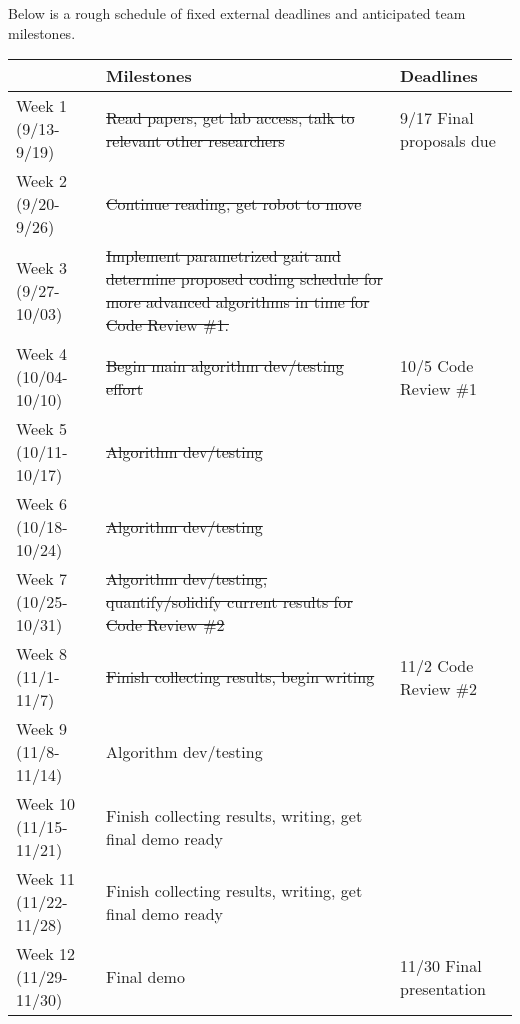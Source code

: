 Below is a rough schedule of fixed external deadlines and anticipated
team milestones.

\newcommand{\done}[1]{{\color{doneColor}\sout{#1}}}

\begin{center}
\begin{tabular}{|l||p{2.5in}|p{1.5in}|}
\hline
                        & {\bf Milestones} & {\bf Deadlines}
\\ \hline

Week 1 (9/13-9/19)    & \done{Read papers, get lab access, talk to relevant other researchers} & 9/17 Final proposals due
\\ \hline

Week 2 (9/20-9/26)    & \done{Continue reading, get robot to move} &
\\ \hline

Week 3 (9/27-10/03)   & \done{Implement parametrized gait and determine proposed coding schedule for more advanced algorithms in time for Code Review \#1.} &
\\ \hline

Week 4 (10/04-10/10)  & \done{Begin main algorithm dev/testing effort} & 10/5 Code Review \#1
\\ \hline

Week 5 (10/11-10/17)  & \done{Algorithm dev/testing} &
\\ \hline

Week 6 (10/18-10/24)  & \done{Algorithm dev/testing} &
\\ \hline

Week 7 (10/25-10/31)  & \done{Algorithm dev/testing, quantify/solidify current results for Code Review \#2} &
\\ \hline

Week 8 (11/1-11/7)    & \done{Finish collecting results, begin writing} & 11/2 Code Review \#2
\\ \hline

Week 9 (11/8-11/14)   & Algorithm dev/testing &
\\ \hline

Week 10 (11/15-11/21) & Finish collecting results, writing, get final demo ready &
\\ \hline

Week 11 (11/22-11/28) & Finish collecting results, writing, get final demo ready  &
\\ \hline

Week 12 (11/29-11/30) & Final demo  & 11/30 Final presentation
\\ \hline
\end{tabular}
\end{center}



